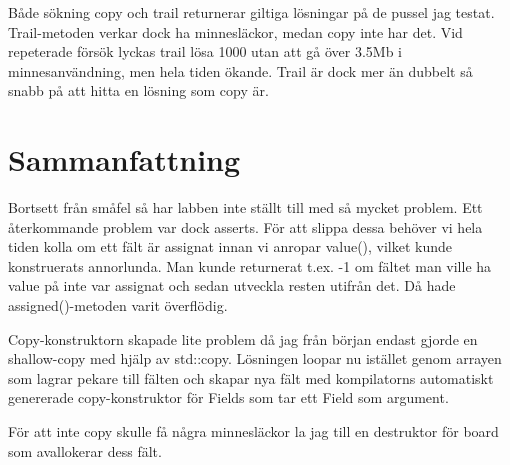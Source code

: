 \documentclass[a4paper, 11pt]{article}
\begin{document}
Både sökning copy och trail returnerar giltiga lösningar på de pussel jag testat. Trail-metoden verkar dock ha minnesläckor, medan copy inte har det. Vid repeterade försök lyckas trail lösa 1000 utan att gå över 3.5Mb i minnesanvändning, men hela tiden ökande. Trail är dock mer än dubbelt så snabb på att hitta en lösning som copy är.


\section{Sammanfattning}

Bortsett från småfel så har labben inte ställt till med så mycket problem. Ett återkommande problem var dock asserts. För att slippa dessa behöver vi hela tiden kolla om ett fält är assignat innan vi anropar value(), vilket kunde konstruerats annorlunda. Man kunde returnerat t.ex. -1 om fältet man ville ha value på inte var assignat och sedan utveckla resten utifrån det. Då hade assigned()-metoden varit överflödig.

Copy-konstruktorn skapade lite problem då jag från början endast gjorde en shallow-copy med hjälp av std::copy. Lösningen loopar nu istället genom arrayen som lagrar pekare till fälten och skapar nya fält med kompilatorns automatiskt genererade copy-konstruktor för Fields som tar ett Field som argument.

För att inte copy skulle få några minnesläckor la jag till en destruktor för board som avallokerar dess fält.
\end{document}
